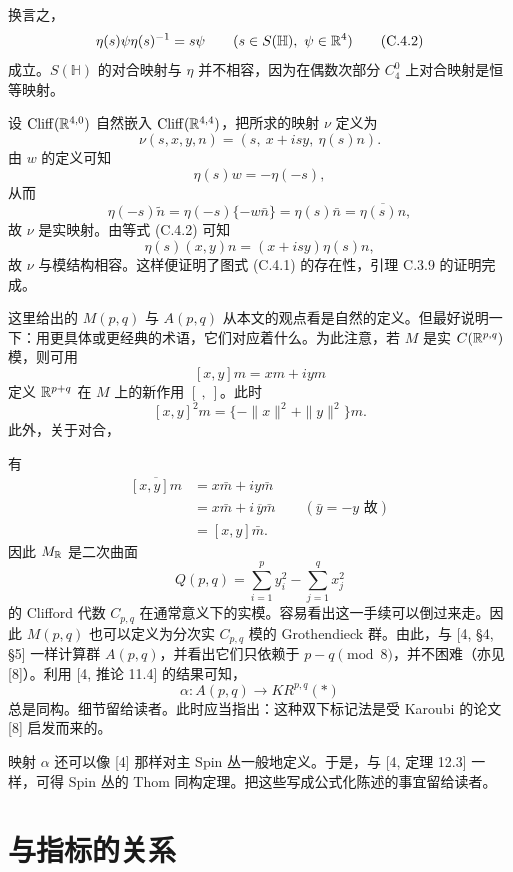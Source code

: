 换言之，
\begin{equation}
  \eta(s)\psi\eta(s)^{-1}=s\psi\qquad(s\in S(\mathbb{H}),\ \psi\in\mathbb{R}^{4}) \tag{C.4.2}
\end{equation}
成立。$S(\mathbb{H})$ 的对合映射与 $\eta$ 并不相容，因为在偶数次部分 $C^{0}_{4}$ 上对合映射是恒等映射。

设 $\mathrm{Cliff}(\mathbb{R}^{4,0})$ 自然嵌入 $\mathrm{Cliff}(\mathbb{R}^{4,4})$，把所求的映射 $\nu$ 定义为
\[
  \nu(s,x,y,n)=(s,\ x+isy,\ \eta(s)n).
\]
由 $w$ 的定义可知
\[
  \eta(s)w=-\eta(-s),
\]
从而
\[
  \eta(-s)\tilde n=\eta(-s)\{-w\bar n\}=\eta(s)\bar n=\overline{\eta(s)n},
\]
故 $\nu$ 是实映射。由等式 (C.4.2) 可知
\[
  \eta(s)(x,y)n=(x+isy)\eta(s)n,
\]
故 $\nu$ 与模结构相容。这样便证明了图式 (C.4.1) 的存在性，引理 C.3.9 的证明完成。

这里给出的 $M(p,q)$ 与 $A(p,q)$ 从本文的观点看是自然的定义。但最好说明一下：用更具体或更经典的术语，它们对应着什么。为此注意，若 $M$ 是实 $C(\mathbb{R}^{p,q})$ 模，则可用
\[
  [x,y]m=xm+iym
\]
定义 $\mathbb{R}^{p+q}$ 在 $M$ 上的新作用 $[\ ,\ ]$。此时
\[
  [x,y]^{2}m=\{-\|x\|^{2}+\|y\|^{2}\}m.
\]
此外，关于对合，

有
\begin{align*}
  \overline{[x,y]m} &= x\bar m+i y\bar m \\
  &= x\bar m+i\,\overline{y}\bar m \qquad(\bar y=-y\text{ 故})\\
  &= [x,y]\bar m .
\end{align*}
因此 $M_{\mathbb{R}}$ 是二次曲面
\[
  Q(p,q)=\sum_{i=1}^{p}y_{i}^{2}-\sum_{j=1}^{q}x_{j}^{2}
\]
的 Clifford 代数 $C_{p,q}$ 在通常意义下的实模。容易看出这一手续可以倒过来走。因此 $M(p,q)$ 也可以定义为分次实 $C_{p,q}$ 模的 Grothendieck 群。由此，与 [4, §4, §5] 一样计算群 $A(p,q)$，并看出它们只依赖于 $p-q \pmod 8$，并不困难（亦见 [8]）。利用 [4, 推论 11.4] 的结果可知，
\[
  \alpha\colon A(p,q)\to KR^{p,q}(*)
\]
总是同构。细节留给读者。此时应当指出：这种双下标记法是受 Karoubi 的论文 [8] 启发而来的。

映射 $\alpha$ 还可以像 [4] 那样对主 $\mathrm{Spin}$ 丛一般地定义。于是，与 [4, 定理 12.3] 一样，可得 $\mathrm{Spin}$ 丛的 Thom 同构定理。把这些写成公式化陈述的事宜留给读者。

\section{与指标的关系}

